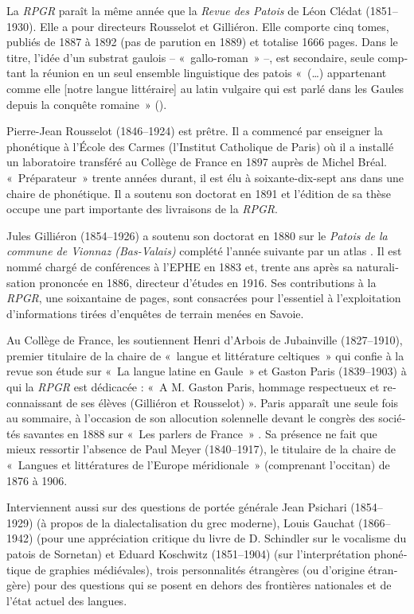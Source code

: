 \documentclass[output=paper]{../langscibook}
\begin{document}
\begin{otherlanguage}{french}
La \textit{RPGR} paraît la même année que la \textit{Revue des Patois} de Léon Clédat (1851--1930). Elle a pour directeurs Rousselot et Gilliéron. Elle comporte cinq tomes, publiés de 1887 à 1892 (pas de parution en 1889) et totalise 1666 pages. Dans le titre, l’idée d’un substrat gaulois – «~gallo-roman~» –, est secondaire, seule comptant la réunion en un seul ensemble linguistique des patois «~(…) appartenant comme elle [notre langue littéraire] au latin vulgaire qui est parlé dans les Gaules depuis la conquête romaine~» (\citealt[1]{rousselot_introduction_1887}). 

Pierre-Jean Rousselot (1846--1924) est prêtre. Il a commencé par enseigner la phonétique à l’École des Carmes (l’Institut Catholique de Paris) où il a installé un laboratoire transféré au Collège de France en 1897 auprès de Michel Bréal. «~Préparateur~» trente années durant, il est élu à soixante-dix-sept ans dans une chaire de phonétique. Il a soutenu son doctorat en 1891 et l’édition de sa thèse occupe une part importante des livraisons de la \textit{RPGR}. 

Jules Gilliéron (1854--1926) a soutenu son doctorat en 1880 sur le \textit{Patois de la commune de Vionnaz (Bas-Valais)} complété l’année suivante par un atlas \citep{gillieron_petit_1881}. Il est nommé chargé de conférences à l’EPHE en 1883 et, trente ans après sa naturalisation prononcée en 1886, directeur d’études en 1916. Ses contributions à la \textit{RPGR}, une soixantaine de pages, sont consacrées pour l’essentiel à l’exploitation d’informations tirées d’enquêtes de terrain menées en Savoie. 

Au Collège de France, les soutiennent Henri d’Arbois de Jubainville (1827--1910), premier titulaire de la chaire de «~langue et littérature celtiques~» qui confie à la revue son étude sur «~La langue latine en Gaule~» \citeyear[161--171]{arbois_de_jubainville_langue_1887} et Gaston Paris (1839--1903) à qui la \textit{RPGR} est dédicacée : «~A M. Gaston Paris, hommage respectueux et reconnaissant de ses élèves (Gilliéron et Rousselot) ». Paris apparaît une seule fois au sommaire, à l’occasion de son allocution solennelle devant le congrès des sociétés savantes en 1888 sur «~Les parlers de France~» \citeyear[161--175]{paris_les_1888}. Sa présence ne fait que mieux ressortir l’absence de Paul Meyer (1840--1917), le titulaire de la chaire de «~Langues et littératures de l’Europe méridionale~» (comprenant l’occitan) de 1876 à 1906.

Interviennent aussi sur des questions de portée générale Jean Psichari (1854--1929) (à propos de la dialectalisation du grec moderne), Louis Gauchat (1866--1942) (pour une appréciation critique du livre de D. Schindler sur le vocalisme du patois de Sornetan) et Eduard Koschwitz (1851--1904) (sur l’interprétation phonétique de graphies médiévales), trois personnalités étrangères (ou d’origine étrangère) pour des questions qui se posent en dehors des frontières nationales et de l’état actuel des langues.


\end{otherlanguage}
\end{document}

